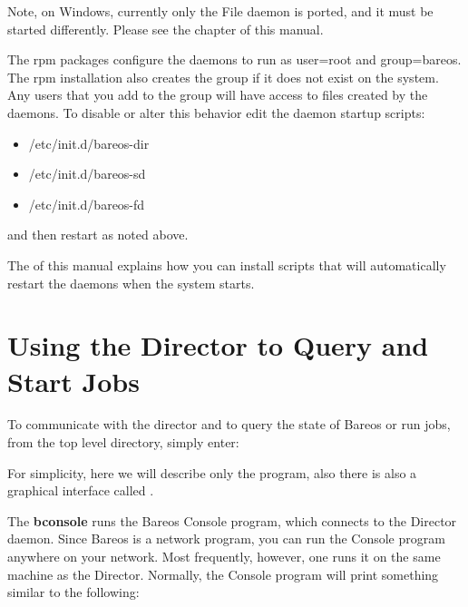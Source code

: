Note, on Windows, currently only the File daemon is ported, and it must be
started differently. Please see the
 chapter of this
manual.

The rpm packages configure the daemons to run as user=root and group=bareos.
The rpm installation also creates the group  if it does not exist on the
system. Any users that you add to the group  will have access to files
created by the daemons. To disable or alter this behavior edit the daemon
startup scripts:

\begin{itemize}
\item /etc/init.d/bareos-dir
\item /etc/init.d/bareos-sd
\item /etc/init.d/bareos-fd
\end{itemize}

and then restart as noted above.

The
 of this manual
explains how you can install scripts that will automatically restart the
daemons when the system starts.

\section{Using the Director to Query and Start Jobs}

To communicate with the director and to query the state of Bareos or run jobs,
from the top level directory, simply enter:


% 
% 

For simplicity, here we will describe only the  program,
also there is also a graphical interface called .

The {\bf bconsole} runs the Bareos Console program, which connects to the
Director daemon. Since Bareos is a network program, you can run the Console
program anywhere on your network. Most frequently, however, one runs it on the
same machine as the Director. Normally, the Console program will print
something similar to the following:

